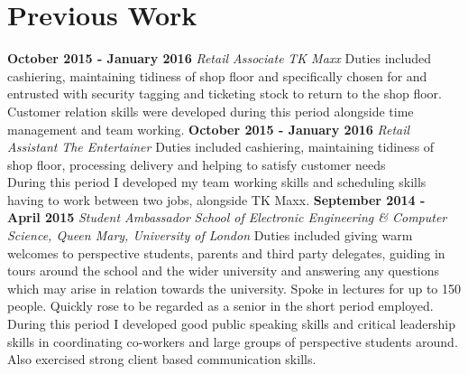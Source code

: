 \section*{Previous Work}
\noindent
\textbf{October 2015 - January 2016} \newline
\indent \textit{Retail Associate} \newline
\indent \textit{TK Maxx} \newline 
\linebreak
\indent Duties included cashiering, maintaining tidiness of shop floor and specifically chosen for and entrusted with security tagging and ticketing stock to return to the shop floor.  \\
\indent Customer relation skills were developed during this period alongside time management and  team working. 
\linebreak
\smallskip 
\linebreak
\noindent 
\textbf{October 2015 - January 2016} \newline
\indent \textit{Retail Assistant} \newline
\indent \textit{The Entertainer} \newline 
\linebreak
\indent Duties included cashiering, maintaining tidiness of shop floor, processing delivery and helping to satisfy customer needs  \\
\indent During this period I developed my team working skills and scheduling skills having to work between two jobs, alongside TK Maxx. \newline
\smallskip
\linebreak
\noindent 
\textbf{September 2014 - April 2015} \newline
\indent \textit{Student Ambassador} \newline
\indent \textit{School of Electronic Engineering \& Computer Science, Queen Mary, University of London} \newline 
\linebreak
\indent Duties included giving warm welcomes to perspective students, parents and third party delegates, guiding in tours around the school and the wider university and answering any questions which may arise in relation towards the university. Spoke in lectures for up to 150 people. Quickly rose to be regarded as a senior in the short period employed.  \\
\indent During this period I developed good public speaking skills and critical leadership skills in coordinating co-workers and large groups of perspective students around. Also exercised strong client based communication skills. 
\linebreak
\smallskip 
\smallskip

